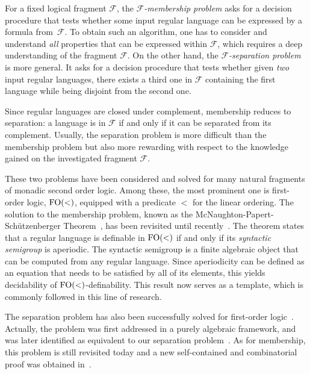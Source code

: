 \documentclass[a4paper,USenglish]{lipics}
\newcommand\Fs{\ensuremath{\mathcal{F}}\xspace}
\newcommand{\fow}{\ensuremath{\textup{FO}(<)}\xspace}
\theoremstyle{plain}
\begin{document}
For a fixed logical fragment \Fs, the \emph{\Fs-membership
  problem} asks for a decision procedure that tests whether some input
regular language can be expressed by a formula from~\Fs. To obtain
such an algorithm, one has to consider and understand \emph{all}
properties that can be expressed within \Fs, which requires a deep
understanding of the fragment \Fs. On the other hand, the
\emph{\Fs-separation problem} is more general. It asks for
a decision procedure that tests whether given \emph{two} input
regular languages, there exists a third one in \Fs containing the
first language while being disjoint from the second one.

Since regular
languages are closed under complement, membership reduces to
separation: a language is in \Fs if and only if it can be separated from
its complement. Usually, the separation problem is more difficult than
the membership problem but also more rewarding with respect to the
knowledge gained on the investigated fragment \Fs.

These two problems have been considered and solved for many natural fragments
of monadic second order logic. Among these, the most prominent one is
first-order logic, \fow, equipped with a predicate $<$ for the linear
ordering. The solution to the membership problem, known as the
McNaughton-Papert-Schützenberger Theorem~\cite{sfo,mnpfo}, has been revisited
until recently~\cite{Diekert&Gastin:First-order-definable-languages:2008:a}.
The theorem states that a regular language is definable in \fow if and only if
its \emph{syntactic semigroup} is aperiodic. The syntactic semigroup is a
finite algebraic object that can be computed from any regular language. Since
aperiodicity can be defined as an equation that needs to be satisfied by all
of its elements, this yields decidability of \fow-definability. This result
now serves as a template, which is commonly followed in this line of research.

The separation problem has also been successfully solved for first-order logic~\cite{Henckell:Pointlike-sets:-finest-aperiodic:1988:a}.
Actually, the problem was first addressed in a purely algebraic
framework, and was later identified as equivalent to our separation
problem~\cite{MR1709911}. As for membership, this problem is still
revisited today and a new self-contained and combinatorial proof was
obtained in~\cite{PZ:lics14}.
\end{document}
